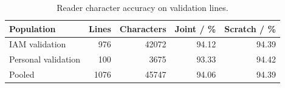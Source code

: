 \begin{table}[H]\centering\small

\begin{tabular}{lrrrr}\toprule

Population & Lines & Characters & Joint / \% & Scratch / \%\\\midrule

IAM validation & 976 & 42072 & 94.12 & 94.39\\

Personal validation & 100 & 3675 & 93.33 & 94.42\\

Pooled & 1076 & 45747 & 94.06 & 94.39\\\bottomrule

\end{tabular}

\caption{Reader character accuracy on validation lines.}\label{tab:res-r2-reader}

\end{table}

